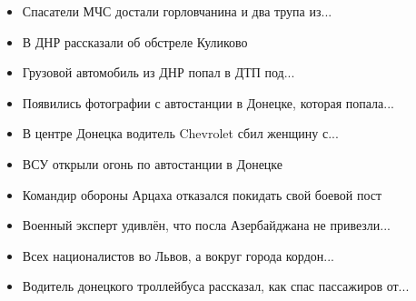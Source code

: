 \begin{itemize}
  \item Спасатели МЧС достали горловчанина и два трупа из...
  \item В ДНР рассказали об обстреле Куликово
  \item Грузовой автомобиль из ДНР попал в ДТП под...
  \item Появились фотографии с автостанции в Донецке, которая попала...
  \item В центре Донецка водитель Chevrolet сбил женщину с...
  \item ВСУ открыли огонь по автостанции в Донецке
  \item Командир обороны Арцаха отказался покидать свой боевой пост
  \item Военный эксперт удивлён, что посла Азербайджана не привезли...
  \item Всех националистов во Львов, а вокруг города кордон...
  \item Водитель донецкого троллейбуса рассказал, как спас пассажиров от...
\end{itemize}
